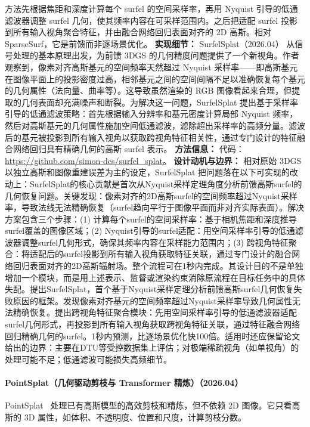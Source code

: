 方法先根据焦距和深度计算每个 surfel 的空间采样率，再用 Nyquist 引导的低通滤波器调整 surfel 几何，使其频率内容在可采样范围内。之后把适配 surfel 投影到所有输入视角聚合特征，并由融合网络回归表面对齐的 2D 高斯。相对 SparseSurf，它是前馈而非逐场景优化。
\textbf{实现细节：} SurfelSplat（2026.04） 从信号处理的基本原理出发，为前馈 3DGS 的几何精度问题提供了一个新视角。作者观察到，像素对齐高斯基元的空间频率天然超过 Nyquist 采样率——即高斯基元在图像平面上的投影密度过高，相邻基元之间的空间间隔不足以准确恢复每个基元的几何属性（法向量、曲率等）。这导致虽然渲染的 RGB 图像看起来合理，但提取的几何表面却充满噪声和断裂。为解决这一问题，SurfelSplat 提出基于采样率引导的低通滤波策略：首先根据输入分辨率和基元密度计算局部 Nyquist 频率，然后对高斯基元的几何属性施加空间低通滤波，滤除超出采样率的高频分量。滤波后的基元被投影到所有输入视角以获取跨视角特征相关性，通过专门设计的特征融合网络回归具有精确几何的高斯 surfel 表示。
\textbf{方法信息：} 代码：\url{https://github.com/simon-dcs/surfel_splat}。
\textbf{设计动机与边界：} 相对原始 3DGS 以独立高斯和图像重建误差为主的设定，SurfelSplat 把问题落在以下可实现的改动上：SurfelSplat的核心贡献是首次从Nyquist采样定理角度分析前馈高斯surfel的几何恢复问题。关键发现：像素对齐的2D高斯surfel的空间频率超过Nyquist采样率，导致法线无法精确恢复（surfel趋向平行于图像平面而非对齐实际表面）。解决方案包含三个步骤：(1) 计算每个surfel的空间采样率：基于相机焦距和深度推导surfel覆盖的图像区域；(2) Nyquist引导的surfel适配：用空间采样率引导的低通滤波器调整surfel几何形式，确保其频率内容在采样能力范围内；(3) 跨视角特征聚合：将适配后的surfel投影到所有输入视角获取特征关联，通过专门设计的融合网络回归表面对齐的2D高斯辐射场。整个流程可在1秒内完成。其设计目的不是单独增加一个模块，而是用上述表示、监督或渲染约束消除原流程在目标任务中的具体失配。提出SurfelSplat，首个基于Nyquist采样定理分析前馈高斯surfel几何恢复失败原因的框架。发现像素对齐基元的空间频率超过Nyquist采样率导致几何属性无法精确恢复。提出跨视角特征聚合模块：先用空间采样率引导的低通滤波器适配surfel几何形式，再投影到所有输入视角获取跨视角特征关联，通过特征融合网络回归精确几何的surfel。1秒内预测，比逐场景优化快100倍。适用时还应保留论文给出的边界：主要在DTU等受控数据集上评估；对极端稀疏视角（如单视角）的处理可能不足；低通滤波可能损失高频细节。
\paragraph{PointSplat（几何驱动剪枝与 Transformer 精炼）（2026.04）}
PointSplat~\cite{2604_09903} 处理已有高斯模型的高效剪枝和精炼，但不依赖 2D 图像。它只看高斯的 3D 属性，如体积、不透明度、位置和尺度，计算剪枝分数。


